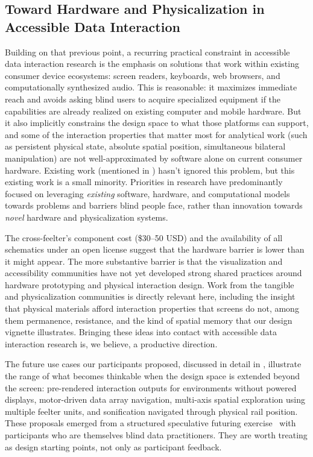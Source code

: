 \documentclass[12pt]{cmuthesis}
\begin{document}
\subsection{Toward Hardware and Physicalization in Accessible Data Interaction}
\label{sec:imperative-2}


Building on that previous point, a recurring practical constraint in accessible data interaction research is the emphasis on solutions that work within existing consumer device ecosystems: screen readers, keyboards, web browsers, and computationally synthesized audio. This is reasonable: it maximizes immediate reach and avoids asking blind users to acquire specialized equipment if the capabilities are already realized on existing computer and mobile hardware. But it also implicitly constrains the design space to what those platforms can support, and some of the interaction properties that matter most for analytical work (such as persistent physical state, absolute spatial position, simultaneous bilateral manipulation) are not well-approximated by software alone on current consumer hardware. Existing work (mentioned in ) hasn't ignored this problem, but this existing work is a small minority. Priorities in research have predominantly focused on leveraging \textit{existing} software, hardware, and computational models towards problems and barriers blind people face, rather than innovation towards \textit{novel} hardware and physicalization systems.

The cross-feelter's component cost (\$30--50 USD) and the availability of all schematics under an open license suggest that the hardware barrier is lower than it might appear. The more substantive barrier is that the visualization and accessibility communities have not yet developed strong shared practices around hardware prototyping and physical interaction design. Work from the tangible and physicalization communities is directly relevant here, including the insight that physical materials afford interaction properties that screens do not, among them permanence, resistance, and the kind of spatial memory that our design vignette illustrates. Bringing these ideas into contact with accessible data interaction research is, we believe, a productive direction.

The future use cases our participants proposed, discussed in detail in , illustrate the range of what becomes thinkable when the design space is extended beyond the screen: pre-rendered interaction outputs for environments without powered displays, motor-driven data array navigation, multi-axis spatial exploration using multiple feelter units, and sonification navigated through physical rail position. These proposals emerged from a structured speculative futuring exercise~\cite{Dunne2013} with participants who are themselves blind data practitioners. They are worth treating as design starting points, not only as participant feedback.
\end{document}
